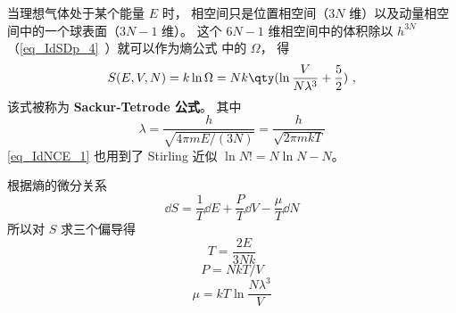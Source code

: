 
\begin{issues}
\issueDraft
\end{issues}


当理想气体处于某个能量 $E$ 时， 相空间只是位置相空间（$3N$ 维）以及动量相空间中的一个球表面（$3N-1$ 维）。 这个 $6N - 1$ 维相空间中的体积除以 $h^{3N}$ （\autoref{eq_IdSDp_4}~）就可以作为熵公式%
中的 $\Omega$， 得
\begin{equation}\label{eq_IdNCE_1}
S(E, V, N) = k\ln \Omega  = Nk \qty(\ln \frac{V}{N\lambda^3} + \frac52)~,
\end{equation}
该式被称为 \textbf{Sackur-Tetrode 公式}。 其中
\begin{equation}\label{eq_IdNCE_2}
\lambda = \frac{h}{\sqrt{4\pi mE/(3N)}} = \frac{h}{\sqrt{2\pi mkT}}
\end{equation}
\autoref{eq_IdNCE_1} 也用到了 Stirling 近似 %
$\ln N! = N\ln N - N$。

根据熵的微分关系 %
\begin{equation}
\dd{S} = \frac{1}{T} \dd{E} + \frac{P}{T} \dd{V} - \frac{\mu}{T} \dd{N}
\end{equation}
所以对 $S$ 求三个偏导得
\begin{equation}
T = \frac{2E}{3Nk}
\end{equation}
\begin{equation}
P = NkT/V
\end{equation}
\begin{equation}
\mu = kT \ln \frac{N\lambda^3}{V}
\end{equation}
